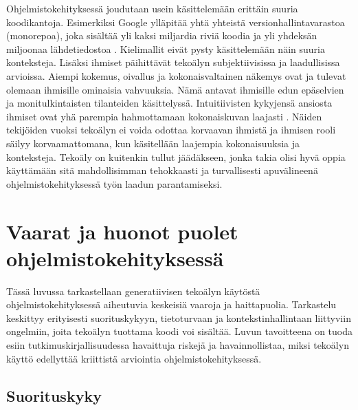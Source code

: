 \documentclass[utf8,bachelor]{gradu3}
\begin{document}
Ohjelmistokehityksessä joudutaan usein käsittelemään erittäin suuria koodikantoja. Esimerkiksi Google ylläpitää yhtä yhteistä versionhallintavarastoa (monorepoa), joka sisältää yli kaksi miljardia riviä koodia ja yli yhdeksän miljoonaa lähdetiedostoa \parencite{noauthor_inside_2024}. Kielimallit eivät pysty käsittelemään näin suuria konteksteja. Lisäksi ihmiset päihittävät tekoälyn subjektiivisissa ja laadullisissa arvioissa. Aiempi kokemus, oivallus ja kokonaisvaltainen näkemys ovat ja tulevat olemaan ihmisille ominaisia vahvuuksia. Nämä antavat ihmisille edun epäselvien ja monitulkintaisten tilanteiden käsittelyssä. Intuitiivisten kykyjensä ansiosta ihmiset ovat yhä parempia hahmottamaan kokonaiskuvan laajasti \parencite{jarrahi_artificial_2018}. Näiden tekijöiden vuoksi tekoälyn ei voida odottaa korvaavan ihmistä ja ihmisen rooli säilyy korvaamattomana, kun käsitellään laajempia kokonaisuuksia ja konteksteja. Tekoäly on kuitenkin tullut jäädäkseen, jonka takia olisi hyvä oppia käyttämään sitä mahdollisimman tehokkaasti ja turvallisesti apuvälineenä ohjelmistokehityksessä työn laadun parantamiseksi.

\chapter{Vaarat ja huonot puolet ohjelmistokehityksessä}

Tässä luvussa tarkastellaan generatiivisen tekoälyn käytöstä ohjelmistokehityksessä aiheutuvia keskeisiä vaaroja ja haittapuolia. Tarkastelu keskittyy erityisesti suorituskykyyn, tietoturvaan ja kontekstinhallintaan liittyviin ongelmiin, joita tekoälyn tuottama koodi voi sisältää. Luvun tavoitteena on tuoda esiin tutkimuskirjallisuudessa havaittuja riskejä ja havainnollistaa, miksi tekoälyn käyttö edellyttää kriittistä arviointia ohjelmistokehityksessä.

\section{Suorituskyky}
\end{document}
